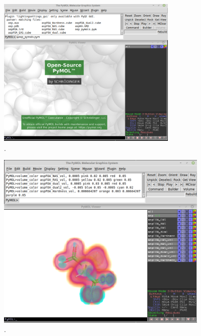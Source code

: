 \documentclass[a4paper,11pt]{refart}
\begin{document}
\hspace*{-\leftmarginwidth}
\begin{minipage}{\fullwidth}
	\begin{figure}[H]
		\begin{center}
			\includegraphics[width=3.4in]{images/tut4_img8}
			\caption{.}
			\label{fig_tut4_6}
		\end{center}
	\end{figure}
\end{minipage}

\hspace*{-\leftmarginwidth}
\begin{minipage}{\fullwidth}
	\begin{figure}[H]
		\begin{center}
			\includegraphics[width=4in]{images/tut4_img9}
			\caption{.}
			\label{fig_tut4_7}
		\end{center}
	\end{figure}
\end{minipage}
\end{document}
